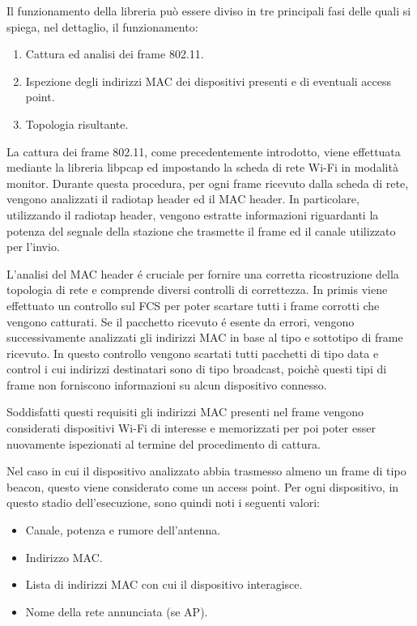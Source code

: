 Il funzionamento della libreria pu\`o essere diviso in tre principali fasi delle quali si  spiega, nel dettaglio, il funzionamento:

\begin{enumerate}
	\item Cattura ed analisi dei frame 802.11.
	\item Ispezione degli indirizzi MAC dei dispositivi presenti e di eventuali access point. 
	\item Topologia risultante.
\end{enumerate}

La cattura dei frame 802.11, come precedentemente introdotto, viene effettuata mediante la libreria libpcap ed impostando la scheda di rete Wi-Fi in modalit\`a monitor.
Durante questa procedura, per ogni frame ricevuto dalla scheda di rete, vengono analizzati il radiotap header ed il MAC header.
In particolare, utilizzando il radiotap header, vengono estratte informazioni riguardanti la potenza del segnale della stazione che trasmette il frame ed il canale utilizzato per l'invio.

L'analisi del MAC header \'e cruciale per fornire una corretta ricostruzione della topologia di rete e comprende diversi controlli di correttezza.
In primis viene effettuato un controllo sul FCS per poter scartare tutti i frame corrotti che vengono catturati.
Se il pacchetto ricevuto \'e esente da errori, vengono successivamente analizzati gli indirizzi MAC in base al tipo e sottotipo di frame ricevuto.
In questo controllo vengono scartati tutti pacchetti di tipo data e control i cui indirizzi destinatari sono di tipo broadcast, poich\`e questi tipi di frame non forniscono informazioni su alcun dispositivo connesso.

Soddisfatti questi requisiti gli indirizzi MAC presenti nel frame vengono considerati dispositivi Wi-Fi di interesse e memorizzati per poi poter esser nuovamente ispezionati al termine del procedimento di cattura.

Nel caso in cui il dispositivo analizzato abbia trasmesso almeno un frame di tipo beacon, questo viene considerato come un access point.
\newpage
Per ogni dispositivo, in questo stadio dell'esecuzione, sono quindi noti i seguenti valori:
\begin{itemize}
	\item Canale, potenza e rumore dell'antenna.
	\item Indirizzo MAC.
	\item Lista di indirizzi MAC con cui il dispositivo interagisce.
	\item Nome della rete annunciata (se AP).
\end{itemize}

